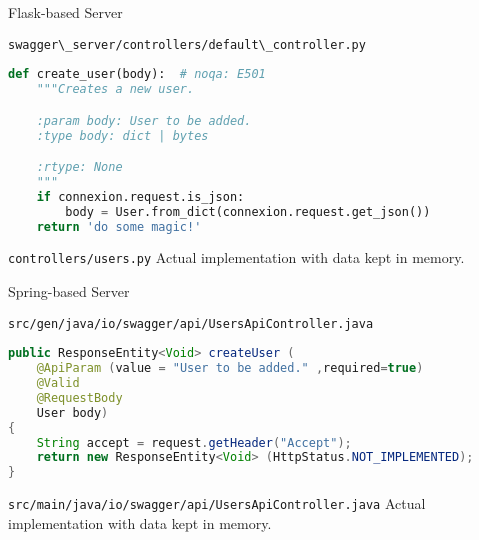 \begin{frame}[fragile]{Flask-based Server}
\begin{block}{\lstinline{swagger\_server/controllers/default\_controller.py}}
\begin{lstlisting}[language=python,style=mini]
def create_user(body):  # noqa: E501
    """Creates a new user.

    :param body: User to be added.
    :type body: dict | bytes

    :rtype: None
    """
    if connexion.request.is_json:
        body = User.from_dict(connexion.request.get_json())
    return 'do some magic!'
\end{lstlisting}
\end{block}

    \begin{block}{\lstinline{controllers/users.py}}
        Actual implementation with data kept in memory.
    \end{block}
\end{frame}


\begin{frame}[fragile]{Spring-based Server}
    \begin{block}{\lstinline{src/gen/java/io/swagger/api/UsersApiController.java}}
\begin{lstlisting}[language=java,style=mini]
public ResponseEntity<Void> createUser (
    @ApiParam (value = "User to be added." ,required=true)
    @Valid
    @RequestBody
    User body)
{
    String accept = request.getHeader("Accept");
    return new ResponseEntity<Void> (HttpStatus.NOT_IMPLEMENTED);
}
\end{lstlisting}
    \end{block}

    \begin{block}{\lstinline{src/main/java/io/swagger/api/UsersApiController.java}}
        Actual implementation with data kept in memory.
    \end{block}
\end{frame}

